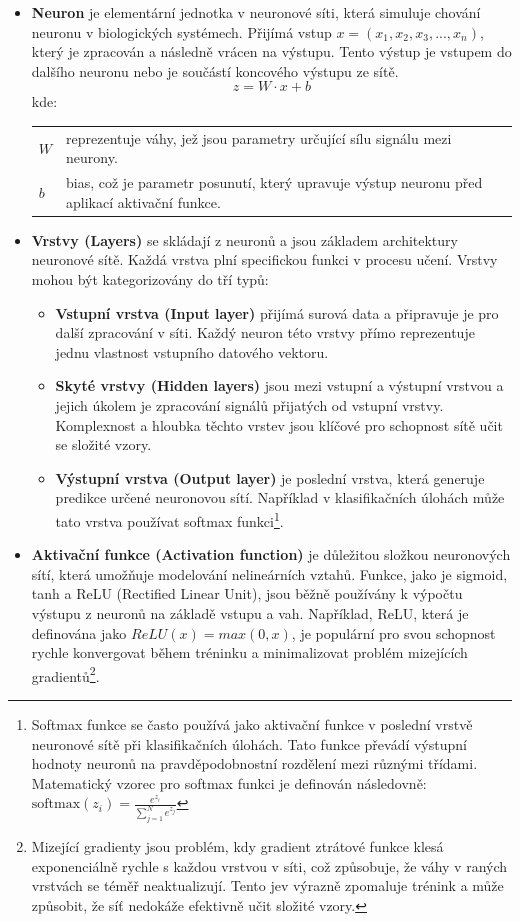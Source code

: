 \documentclass[male,czech,api_ing]{thesis}
\makeatletter
\newenvironment{conditions}[1][kde:]
    {#1 \begin{tabular}[t]{>{$}l<{$} @{${}={}$} >{\raggedright\arraybackslash}p{10cm}}}
    {\end{tabular}}
\makeatother
\begin{document}
\begin{itemize}
    \item \textbf{Neuron} je elementární jednotka v neuronové síti, která simuluje chování neuronu v biologických systémech. Přijímá vstup $x = (x_1, x_2, x_3, ..., x_n)$, který je zpracován a následně vrácen na výstupu. Tento výstup je vstupem do dalšího neuronu nebo je součástí koncového výstupu ze sítě.
        \begin{equation}
            z = W \cdot x + b
        \end{equation}
        \begin{conditions}
            W & reprezentuje váhy, jež jsou parametry určující sílu signálu mezi neurony. \\
            b & bias, což je parametr posunutí, který upravuje výstup neuronu před aplikací aktivační funkce.
        \end{conditions}
    \item \textbf{Vrstvy (Layers)} se skládají z neuronů a jsou základem architektury neuronové sítě. Každá vrstva plní specifickou funkci v procesu učení. Vrstvy mohou být kategorizovány do tří typů:
        \begin{itemize}
            \item \textbf{Vstupní vrstva (Input layer)} přijímá surová data a připravuje je pro další zpracování v síti. Každý neuron této vrstvy přímo reprezentuje jednu vlastnost vstupního datového vektoru.
            \item \textbf{Skyté vrstvy (Hidden layers)} jsou mezi vstupní a výstupní vrstvou a jejich úkolem je zpracování signálů přijatých od vstupní vrstvy. Komplexnost a hloubka těchto vrstev jsou klíčové pro schopnost sítě učit se složité vzory.
            \item \textbf{Výstupní vrstva (Output layer) } je poslední vrstva, která generuje predikce určené neuronovou sítí. Například v klasifikačních úlohách může tato vrstva používat softmax funkci\footnote{Softmax funkce se často používá jako aktivační funkce v poslední vrstvě neuronové sítě při klasifikačních úlohách. Tato funkce převádí výstupní hodnoty neuronů na pravděpodobnostní rozdělení mezi různými třídami. Matematický vzorec pro softmax funkci je definován následovně: $\text{softmax}(z_i) = \frac{e^{z_i}}{\sum_{j=1}^{N} e^{z_j}}$}.
        \end{itemize}
    \item \textbf{Aktivační funkce (Activation function)} je důležitou složkou neuronových sítí, která umožňuje modelování nelineárních vztahů. Funkce, jako je sigmoid, tanh a ReLU (Rectified Linear Unit), jsou běžně používány k výpočtu výstupu z neuronů na základě vstupu a vah. Například, ReLU, která je definována jako $ReLU(x) = max(0, x)$, je populární pro svou schopnost rychle konvergovat během tréninku a minimalizovat problém mizejících gradientů\footnote{Mizející gradienty jsou problém, kdy gradient ztrátové funkce klesá exponenciálně rychle s každou vrstvou v síti, což způsobuje, že váhy v raných vrstvách se téměř neaktualizují. Tento jev výrazně zpomaluje trénink a může způsobit, že síť nedokáže efektivně učit složité vzory.}.

\end{itemize}
\end{document}
